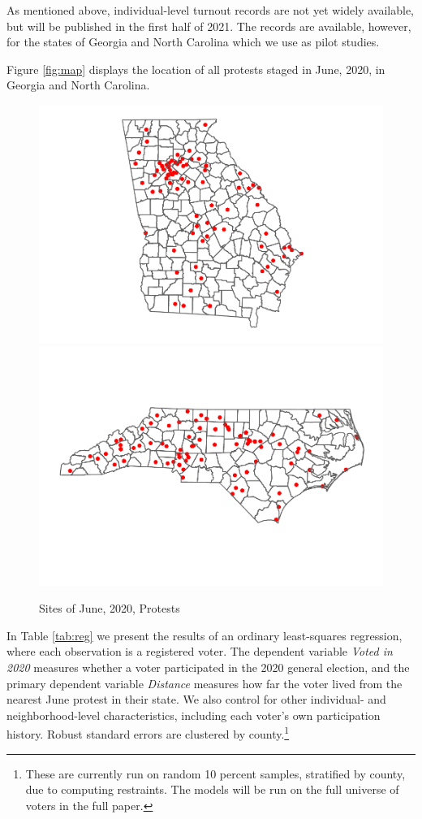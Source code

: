 \documentclass[
  12pt,
]{article}
\begin{document}
As mentioned above, individual-level turnout records are not yet widely available, but will be published in the first half of 2021. The records are available, however, for the states of Georgia and North Carolina which we use as pilot studies.

Figure \ref{fig:map} displays the location of all protests staged in June, 2020, in Georgia and North Carolina.

\begin{figure}[H]
\includegraphics[width=0.5\linewidth]{asa_abstract_files/figure-latex/figures-side-1} \includegraphics[width=0.5\linewidth]{asa_abstract_files/figure-latex/figures-side-2} \caption{\label{fig:map}Sites of June, 2020, Protests}\label{fig:figures-side}
\end{figure}

In Table \ref{tab:reg} we present the results of an ordinary least-squares regression, where each observation is a registered voter. The dependent variable \emph{Voted in 2020} measures whether a voter participated in the 2020 general election, and the primary dependent variable \emph{Distance} measures how far the voter lived from the nearest June protest in their state. We also control for other individual- and neighborhood-level characteristics, including each voter's own participation history. Robust standard errors are clustered by county.\footnote{These are currently run on random 10 percent samples, stratified by county, due to computing restraints. The models will be run on the full universe of voters in the full paper.}

\begin{singlespace}

\end{singlespace}
\end{document}
